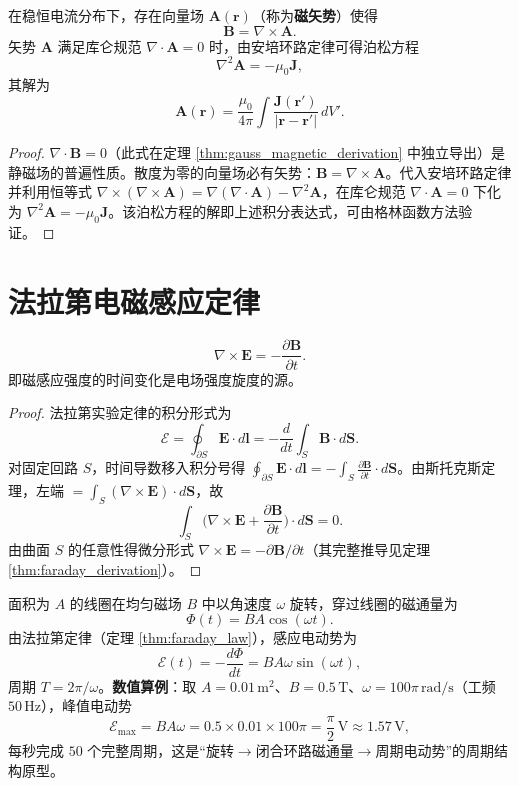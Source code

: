 \begin{theorem}[静磁场的矢势表示]\label{thm:magnetic_vector_potential}
在稳恒电流分布下，存在向量场 $\mathbf{A}(\mathbf{r})$（称为\textbf{磁矢势}）使得
\[
\boxed{\mathbf{B} = \nabla \times \mathbf{A}}.
\]
矢势 $\mathbf{A}$ 满足库仑规范 $\nabla \cdot \mathbf{A} = 0$ 时，由安培环路定律可得泊松方程
\[
\nabla^2 \mathbf{A} = -\mu_0 \mathbf{J},
\]
其解为
\[
\mathbf{A}(\mathbf{r}) = \frac{\mu_0}{4\pi} \int \frac{\mathbf{J}(\mathbf{r}')}{|\mathbf{r}-\mathbf{r}'|}\, dV'.
\]
\end{theorem}

\begin{proof}
$\nabla \cdot \mathbf{B} = 0$（此式在定理 \ref{thm:gauss_magnetic_derivation} 中独立导出）是静磁场的普遍性质。散度为零的向量场必有矢势：$\mathbf{B} = \nabla \times \mathbf{A}$。代入安培环路定律并利用恒等式 $\nabla\times(\nabla\times\mathbf{A}) = \nabla(\nabla\cdot\mathbf{A}) - \nabla^2\mathbf{A}$，在库仑规范 $\nabla\cdot\mathbf{A} = 0$ 下化为 $\nabla^2\mathbf{A} = -\mu_0\mathbf{J}$。该泊松方程的解即上述积分表达式，可由格林函数方法验证。
\end{proof}

\section{法拉第电磁感应定律}

\begin{theorem}[法拉第电磁感应定律]\label{thm:faraday_law}
\[
\boxed{\nabla \times \mathbf{E} = -\frac{\partial \mathbf{B}}{\partial t}}.
\]
即磁感应强度的时间变化是电场强度旋度的源。
\end{theorem}

\begin{proof}
法拉第实验定律的积分形式为
\[
\mathcal{E} = \oint_{\partial S} \mathbf{E}\cdot d\mathbf{l} = -\frac{d}{dt}\int_S \mathbf{B}\cdot d\mathbf{S}.
\]
对固定回路 $S$，时间导数移入积分号得 $\oint_{\partial S}\mathbf{E}\cdot d\mathbf{l} = -\int_S \frac{\partial\mathbf{B}}{\partial t}\cdot d\mathbf{S}$。由斯托克斯定理，左端 $=\int_S(\nabla\times\mathbf{E})\cdot d\mathbf{S}$，故
\[
\int_S \Big(\nabla\times\mathbf{E} + \frac{\partial\mathbf{B}}{\partial t}\Big)\cdot d\mathbf{S} = 0.
\]
由曲面 $S$ 的任意性得微分形式 $\nabla\times\mathbf{E} = -\partial\mathbf{B}/\partial t$（其完整推导见定理 \ref{thm:faraday_derivation}）。
\end{proof}

\begin{example}[交流发电机中的周期电动势]\label{ex:ac_generator}
面积为 $A$ 的线圈在均匀磁场 $B$ 中以角速度 $\omega$ 旋转，穿过线圈的磁通量为
\[
\Phi(t) = BA\cos(\omega t).
\]
由法拉第定律（定理 \ref{thm:faraday_law}），感应电动势为
\[
\mathcal{E}(t) = -\frac{d\Phi}{dt} = BA\omega\sin(\omega t),
\]
周期 $T = 2\pi/\omega$。\textbf{数值算例}：取 $A = 0.01\,\text{m}^2$、$B = 0.5\,\text{T}$、$\omega = 100\pi\,\text{rad/s}$（工频 $50\,\text{Hz}$），峰值电动势
\[
\mathcal{E}_{\max} = BA\omega = 0.5\times 0.01\times 100\pi = \frac{\pi}{2}\,\text{V} \approx 1.57\,\text{V},
\]
每秒完成 $50$ 个完整周期，这是“旋转$\to$闭合环路磁通量$\to$周期电动势”的周期结构原型。
\end{example}

